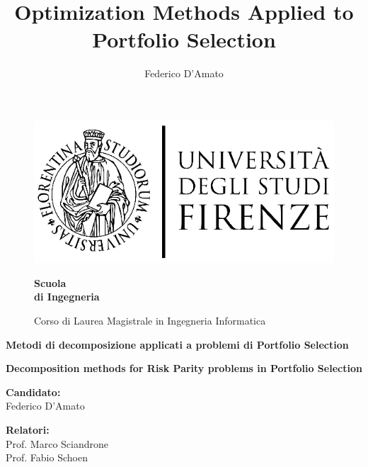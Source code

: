 \documentclass[a4paper, oneside, 11pt, titlepage]{book}
\title{Optimization Methods Applied to Portfolio Selection}
\author{Federico D'Amato}
\numberwithin{equation}{section}
\begin{document}
\begin{titlepage}
\begin{figure}[htbp]
\begin{minipage}{0.3\textwidth}
\centering
\includegraphics[scale=0.8]{logo_universita.eps}
\end{minipage}
\hspace{0.3\textwidth}
%
\begin{minipage}{0.4\textwidth}
\centering
\begin{flushright}
{\Large \textbf{Scuola\\
 di Ingegneria \\}
}
\end{flushright}
\begin{flushright}
Corso di Laurea Magistrale in Ingegneria Informatica
\end{flushright}
\end{minipage}

\end{figure}


\vspace{15mm}
\begin{center}

{\huge {\bf Metodi di decomposizione applicati a problemi di Portfolio Selection}
 }

\vspace{10mm} 
 {\huge {\bf Decomposition methods for Risk Parity problems in Portfolio Selection}
 }

\end{center}
\vspace{25mm}

\noindent
{\Large \textbf{Candidato:}}\\
\noindent
{\LARGE Federico D'Amato\\}

\noindent
{\Large \textbf{Relatori:}\\}
\noindent
{\LARGE Prof. Marco Sciandrone\\
Prof. Fabio Schoen\\
}

\vfill
{}
\end{titlepage} 
\end{document}
